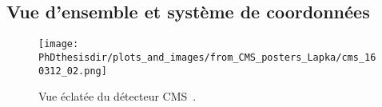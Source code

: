 \subsection{Vue d'ensemble et système de coordonnées}\label{chapter-LHC-section-CMS-subsec-overview_and_coordinates}

\begin{figure}[h]
\centering
\texttt{[image: \\PhDthesisdir/plots\_and\_images/from\_CMS\_posters\_Lapka/cms\_160312\_02.png]}
\caption[Vue éclatée du détecteur CMS.]{Vue éclatée du détecteur CMS~\cite{CMS_posters_Lapka}.}
\label{fig-chapter-LHC-section-CMS-subsec-overview_and_coordinates-vue_eclatee_CMS}
\end{figure}